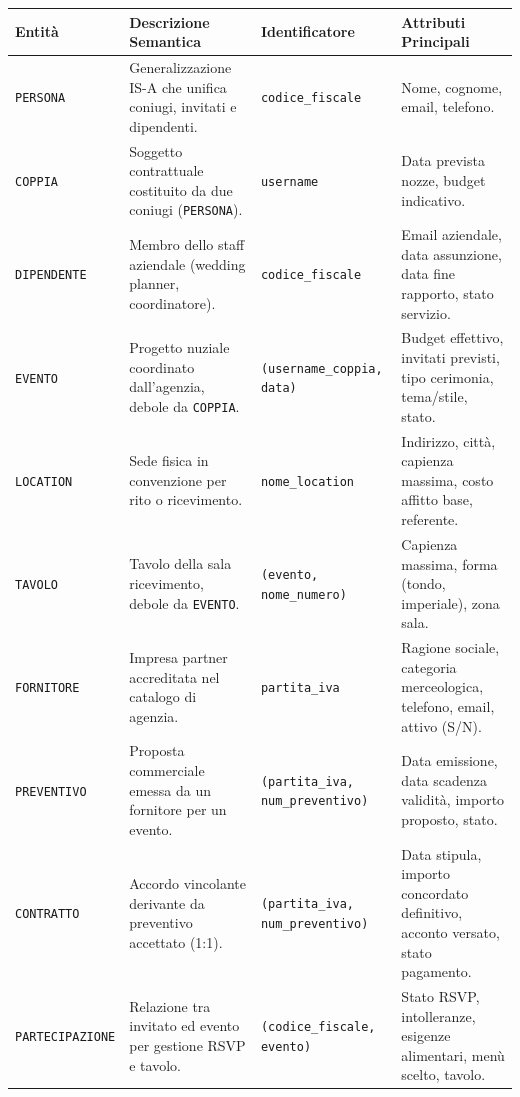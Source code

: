 \begin{table}[h!]
\centering
\small
\begin{tabularx}{\textwidth}{l p{4cm} p{3.5cm} X}
\toprule
\textbf{Entità} & \textbf{Descrizione Semantica} & \textbf{Identificatore} & \textbf{Attributi Principali} \\
\midrule
\texttt{PERSONA} & Generalizzazione IS-A che unifica coniugi, invitati e dipendenti. & \texttt{codice\_fiscale} & Nome, cognome, email, telefono. \\
\addlinespace
\texttt{COPPIA} & Soggetto contrattuale costituito da due coniugi (\texttt{PERSONA}). & \texttt{username} & Data prevista nozze, budget indicativo. \\
\addlinespace
\texttt{DIPENDENTE} & Membro dello staff aziendale (wedding planner, coordinatore). & \texttt{codice\_fiscale} & Email aziendale, data assunzione, data fine rapporto, stato servizio. \\
\addlinespace
\texttt{EVENTO} & Progetto nuziale coordinato dall'agenzia, debole da \texttt{COPPIA}. & \texttt{(username\_coppia, data)} & Budget effettivo, invitati previsti, tipo cerimonia, tema/stile, stato. \\
\addlinespace
\texttt{LOCATION} & Sede fisica in convenzione per rito o ricevimento. & \texttt{nome\_location} & Indirizzo, città, capienza massima, costo affitto base, referente. \\
\addlinespace
\texttt{TAVOLO} & Tavolo della sala ricevimento, debole da \texttt{EVENTO}. & \texttt{(evento, nome\_numero)} & Capienza massima, forma (tondo, imperiale), zona sala. \\
\addlinespace
\texttt{FORNITORE} & Impresa partner accreditata nel catalogo di agenzia. & \texttt{partita\_iva} & Ragione sociale, categoria merceologica, telefono, email, attivo (S/N). \\
\addlinespace
\texttt{PREVENTIVO} & Proposta commerciale emessa da un fornitore per un evento. & \texttt{(partita\_iva, num\_preventivo)} & Data emissione, data scadenza validità, importo proposto, stato. \\
\addlinespace
\texttt{CONTRATTO} & Accordo vincolante derivante da preventivo accettato (1:1). & \texttt{(partita\_iva, num\_preventivo)} & Data stipula, importo concordato definitivo, acconto versato, stato pagamento. \\
\addlinespace
\texttt{PARTECIPAZIONE}& Relazione tra invitato ed evento per gestione RSVP e tavolo. & \texttt{(codice\_fiscale, evento)} & Stato RSVP, intolleranze, esigenze alimentari, menù scelto, tavolo. \\

\end{tabularx}
\end{table}
